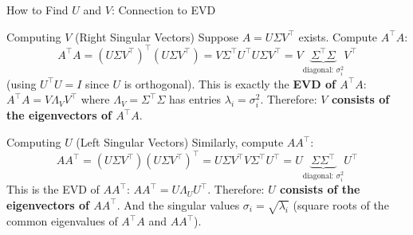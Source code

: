 \documentclass{beamer}
\begin{document}
\begin{frame}[shrink=10]{How to Find $U$ and $V$: Connection to EVD}
  \begin{block}{Computing $V$ (Right Singular Vectors)}
    Suppose $A = U\Sigma V^\top$ exists.
    Compute $A^\top A$:
    \[
      A^\top A
        = (U\Sigma V^\top)^\top (U\Sigma V^\top)
        = V\Sigma^\top U^\top U\Sigma V^\top
        = V\underbrace{\Sigma^\top\Sigma}_{\text{diagonal: }\sigma_i^2}V^\top
    \]
    (using $U^\top U = I$ since $U$ is orthogonal).
    This is exactly the \textbf{EVD of $A^\top A$}:
    $A^\top A = V\Lambda_V V^\top$ where $\Lambda_V = \Sigma^\top\Sigma$
    has entries $\lambda_i = \sigma_i^2$.
    Therefore: \textbf{$V$ consists of the eigenvectors of $A^\top A$}.
  \end{block}

  \begin{block}{Computing $U$ (Left Singular Vectors)}
    Similarly, compute $AA^\top$:
    \[
      AA^\top
        = (U\Sigma V^\top)(U\Sigma V^\top)^\top
        = U\Sigma V^\top V\Sigma^\top U^\top
        = U\underbrace{\Sigma\Sigma^\top}_{\text{diagonal: }\sigma_i^2}U^\top
    \]
    This is the EVD of $AA^\top$:
    $AA^\top = U\Lambda_U U^\top$.
    Therefore: \textbf{$U$ consists of the eigenvectors of $AA^\top$}.
    And the singular values $\sigma_i = \sqrt{\lambda_i}$
    (square roots of the common eigenvalues of $A^\top A$ and $AA^\top$).
  \end{block}
\end{frame}
\end{document}
